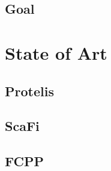 \subsection{Goal}
\label{subsec:goal}


\section{State of Art}
\label{sec:state-of-art}

\subsection{Protelis}
\label{subsec:protelis}

\subsection{ScaFi}
\label{subsec:scafi}

\subsection{FCPP}
\label{subsec:fcpp}


%
%
%
%
%
